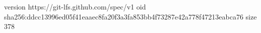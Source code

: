 version https://git-lfs.github.com/spec/v1
oid sha256:ddcc13996ed05f41eaaec8fa20f3a3fa853bb4f73287e42a778f47213eabca76
size 378

